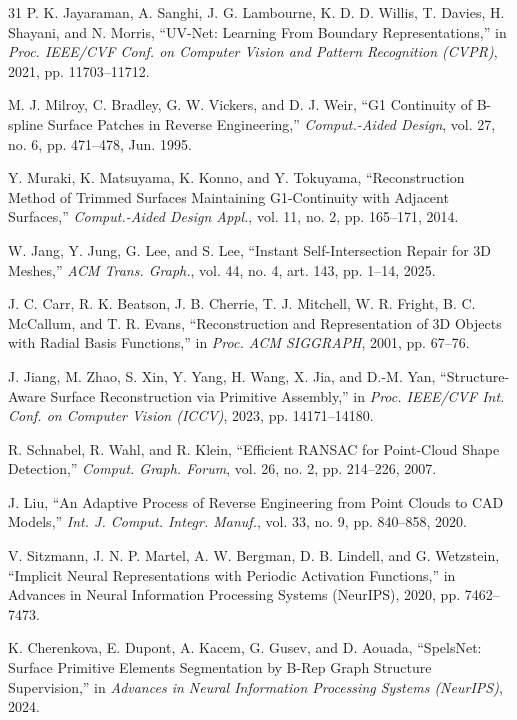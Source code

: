 \documentclass{ieeeaccess}
\begin{document}
\begin{thebibliography}{31}
P. K. Jayaraman, A. Sanghi, J. G. Lambourne, K. D. D. Willis, T. Davies, H. Shayani, and N. Morris,
``UV-Net: Learning From Boundary Representations,''
in \emph{Proc. IEEE/CVF Conf. on Computer Vision and Pattern Recognition (CVPR)}, 2021, pp. 11703--11712.

M. J. Milroy, C. Bradley, G. W. Vickers, and D. J. Weir,
``G1 Continuity of B-spline Surface Patches in Reverse Engineering,''
\emph{Comput.-Aided Design}, vol. 27, no. 6, pp. 471--478, Jun. 1995.

Y. Muraki, K. Matsuyama, K. Konno, and Y. Tokuyama,
``Reconstruction Method of Trimmed Surfaces Maintaining G1-Continuity with Adjacent Surfaces,''
\emph{Comput.-Aided Design Appl.}, vol. 11, no. 2, pp. 165--171, 2014.

W. Jang, Y. Jung, G. Lee, and S. Lee,
``Instant Self-Intersection Repair for 3D Meshes,''
\emph{ACM Trans. Graph.}, vol. 44, no. 4, art. 143, pp. 1--14, 2025.

J. C. Carr, R. K. Beatson, J. B. Cherrie, T. J. Mitchell, W. R. Fright, B. C. McCallum, and T. R. Evans,
``Reconstruction and Representation of 3D Objects with Radial Basis Functions,''
in \emph{Proc. ACM SIGGRAPH}, 2001, pp. 67--76.

J. Jiang, M. Zhao, S. Xin, Y. Yang, H. Wang, X. Jia, and D.-M. Yan,
``Structure-Aware Surface Reconstruction via Primitive Assembly,''
in \emph{Proc. IEEE/CVF Int. Conf. on Computer Vision (ICCV)}, 2023, pp. 14171--14180.

R. Schnabel, R. Wahl, and R. Klein,
``Efficient RANSAC for Point-Cloud Shape Detection,''
\emph{Comput. Graph. Forum}, vol. 26, no. 2, pp. 214--226, 2007.

J. Liu,
``An Adaptive Process of Reverse Engineering from Point Clouds to CAD Models,''
\emph{Int. J. Comput. Integr. Manuf.}, vol. 33, no. 9, pp. 840--858, 2020.

V. Sitzmann, J. N. P. Martel, A. W. Bergman, D. B. Lindell, and G. Wetzstein,
``Implicit Neural Representations with Periodic Activation Functions,''
in Advances in Neural Information Processing Systems (NeurIPS), 2020, pp. 7462--7473.

K. Cherenkova, E. Dupont, A. Kacem, G. Gusev, and D. Aouada,
``SpelsNet: Surface Primitive Elements Segmentation by B-Rep Graph Structure Supervision,''
in \emph{Advances in Neural Information Processing Systems (NeurIPS)}, 2024.


\end{thebibliography}
\end{document}
